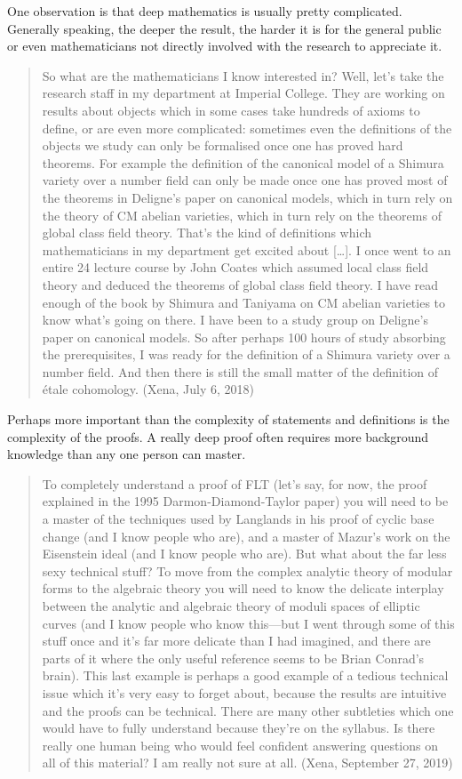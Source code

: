 \documentclass[12pt]{amsart}
\theoremstyle{definition}
\theoremstyle{remark}
\numberwithin{equation}{section}
\begin{document}
One observation is that deep mathematics is usually pretty complicated. Generally speaking, the deeper the result, the harder it is for the general public or even mathematicians not directly involved with the research to appreciate it.
\begin{quote}
  So what are the mathematicians I know interested in? Well, let’s take the research staff in my department at Imperial College. They are working on results about objects which in some cases take hundreds of axioms to define, or are even more complicated: sometimes even the definitions of the objects we study can only be formalised once one has proved hard theorems. For example the definition of the canonical model of a Shimura variety over a number field can only be made once one has proved most of the theorems in Deligne's paper on canonical models, which in turn rely on the theory of CM abelian varieties, which in turn rely on the theorems of global class field theory. That's the kind of definitions which mathematicians in my department get excited about [\ldots]. I once went to an entire 24 lecture course by John Coates which assumed local class field theory and deduced the theorems of global class field theory. I have read enough of the book by Shimura and Taniyama on CM abelian varieties to know what's going on there. I have been to a study group on Deligne's paper on canonical models. So after perhaps 100 hours of study absorbing the prerequisites, I was ready for the definition of a Shimura variety over a number field. And then there is still the small matter of the definition of \'etale cohomology. (Xena, July 6, 2018)
\end{quote}
Perhaps more important than the complexity of statements and definitions is the complexity of the proofs. A really deep proof often requires more background knowledge than any one person can master.
\begin{quote}
  To completely understand a proof of FLT (let’s say, for now, the proof explained in the 1995 Darmon-Diamond-Taylor paper) you will need to be a master of the techniques used by Langlands in his proof of cyclic base change (and I know people who are), and a master of Mazur's work on the Eisenstein ideal (and I know people who are). But what about the far less sexy technical stuff? To move from the complex analytic theory of modular forms to the algebraic theory you will need to know the delicate interplay between the analytic and algebraic theory of moduli spaces of elliptic curves (and I know people who know this---but I went through some of this stuff once and it's far more delicate than I had imagined, and there are parts of it where the only useful reference seems to be Brian Conrad's brain). This last example is perhaps a good example of a tedious technical issue which it’s very easy to forget about, because the results are intuitive and the proofs can be technical. There are many other subtleties which one would have to fully understand because they're on the syllabus. Is there really one human being who would feel confident answering questions on all of this material? I am really not sure at all. (Xena, September 27, 2019)
\end{quote}
\end{document}
